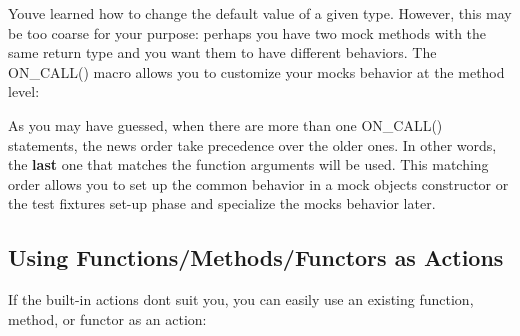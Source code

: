 You\textquotesingle{}ve learned how to change the default value of a given type. However, this may be too coarse for your purpose\+: perhaps you have two mock methods with the same return type and you want them to have different behaviors. The {\ttfamily O\+N\+\_\+\+C\+A\+L\+L()} macro allows you to customize your mock\textquotesingle{}s behavior at the method level\+:


\begin{DoxyCode}{0}
\DoxyCodeLine{}
\DoxyCodeLine{}
\end{DoxyCode}


As you may have guessed, when there are more than one {\ttfamily O\+N\+\_\+\+C\+A\+L\+L()} statements, the news order take precedence over the older ones. In other words, the {\bfseries{last}} one that matches the function arguments will be used. This matching order allows you to set up the common behavior in a mock object\textquotesingle{}s constructor or the test fixture\textquotesingle{}s set-\/up phase and specialize the mock\textquotesingle{}s behavior later.

\subsection*{Using Functions/\+Methods/\+Functors as Actions}

If the built-\/in actions don\textquotesingle{}t suit you, you can easily use an existing function, method, or functor as an action\+:


\begin{DoxyCode}{0}
\DoxyCodeLine{}
\DoxyCodeLine{\};}
\DoxyCodeLine{}
\DoxyCodeLine{}
\DoxyCodeLine{\};}
\DoxyCodeLine{}
\DoxyCodeLine{}
\end{DoxyCode}


